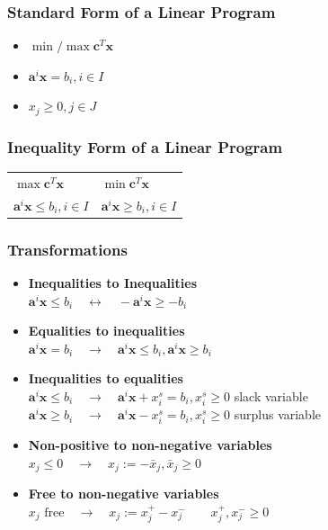 \documentclass[11pt]{article}
\begin{document}
\subsubsection{Standard Form of a Linear Program}
\begin{itemize}[label=,noitemsep,nosep, leftmargin=0.25cm]
	\item $ \min/\max \textbf{c}^T\textbf{x} $
	\item $ \textbf{a}^i\textbf{x} = b_i, i\in I $
	\item $ x_j \geq 0, j\in J $
\end{itemize}

\subsubsection{Inequality Form of a Linear Program}
\begin{tabularx}{\linewidth}{p{0.5\linewidth} p{0.5\linewidth}}
	$\max \textbf{c}^T \textbf{x}$ & $\min \textbf{c}^T \textbf{x}$\\
	$ \textbf{a}^i\textbf{x} \leq b_i, i\in I $ & $ \textbf{a}^i\textbf{x} \geq b_i, i\in I $
\end{tabularx}

\subsubsection{Transformations}
\begin{itemize}[label=-]
	\item \textbf{Inequalities to Inequalities}\\
	$\textbf{a}^i\textbf{x}\leq b_i \quad \leftrightarrow \quad - \textbf{a}^i\textbf{x} \geq -b_i$
	\item \textbf{Equalities to inequalities}\\
	$ \textbf{a}^i\textbf{x} = b_i \quad \rightarrow \quad \textbf{a}^i\textbf{x}\leq b_i, \textbf{a}^i\textbf{x} \geq b_i $
	\item \textbf{Inequalities to equalities}\\
	$ \textbf{a}^i\textbf{x} \leq b_i \quad \rightarrow \quad \textbf{a}^i\textbf{x} + x_i^s = b_i, x_i^s\geq 0$ \qquad slack variable\\
	$ \textbf{a}^i\textbf{x} \geq b_i \quad \rightarrow \quad \textbf{a}^i\textbf{x} - x_i^s = b_i, x_i^s\geq 0$ \qquad surplus variable
	\item \textbf{Non-positive to non-negative variables}\\
	$ x_j \leq 0\quad \rightarrow \quad x_j := -\bar{x}_j, \bar{x}_j \geq 0 $
	\item \textbf{Free to non-negative variables}\\
	$ x_j \text{ free} \quad \rightarrow \quad x_j := x_j^+ - x_j^- \qquad x_j^+, x_j^- \geq 0$ 
\end{itemize}
\end{document}
